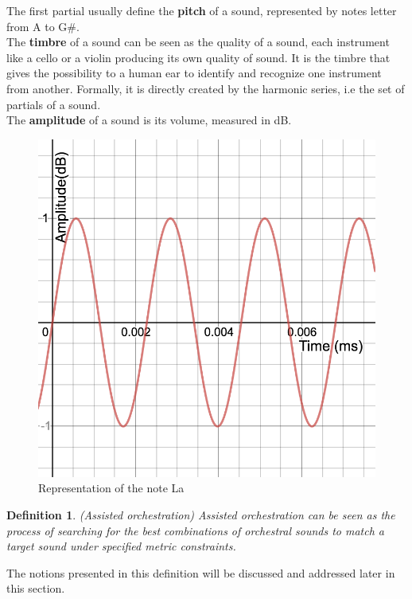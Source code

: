 \documentclass[a4paper]{book}
\newtheorem{definition}{Definition}
\begin{document}
The first partial usually define the \textbf{pitch} of a sound, represented by notes letter from A to G$\#$.\\

The \textbf{timbre} of a sound can be seen as the quality of a sound, each instrument like a cello or a violin producing its own quality of sound. It is the timbre that gives the possibility to a human ear to identify and recognize one instrument from another. Formally, it is directly created by the harmonic series, i.e the set of partials of a sound.\\

The \textbf{amplitude} of a sound is its volume, measured in dB.
\begin{figure}[h!]
\centering
\includegraphics[scale=0.3]{A440.png}
\caption{Representation of the note La}
\label{figassistedorch}
\end{figure}


\begin{definition}{\emph{(Assisted orchestration)}}
Assisted orchestration can be seen as the process of searching for the best combinations of orchestral sounds to match a target sound under specified metric constraints.
\end{definition}

The notions presented in this definition will be discussed and addressed later in this section.
\end{document}
